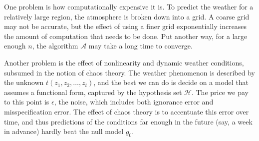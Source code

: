 \documentclass[12pt]{article}
\begin{document}

\begin{enumerate}


One problem is how computationally expensive it is. To predict the weather for
a relatively large region, the atmosphere is broken down into a grid. A coarse
grid may not be accurate, but the effect of using a finer grid exponentially increases
the amount of computation that needs to be done. Put another way, for a large enough
$n$, the algorithm $\mathcal{A}$ may take a long time to converge.

Another problem is the effect of nonlinearity and dynamic weather conditions,
subsumed in the notion of chaos theory. The weather phenomenon is
described by the unknown $t(z_1,z_2,\ldots,z_t)$, and the best we can do
is decide on a model that assumes a functional form, captured by the hypothesis
set $\mathcal{H}$. The price we pay to this point is $\epsilon$,
the noise, which includes both ignorance error and misspecification error.
The effect of chaos theory is to accentuate this error over time,
and thus predictions of the conditions far enough in the future (say, a week in
advance) hardly beat the null model $g_0$.



\end{enumerate}
\end{document}
